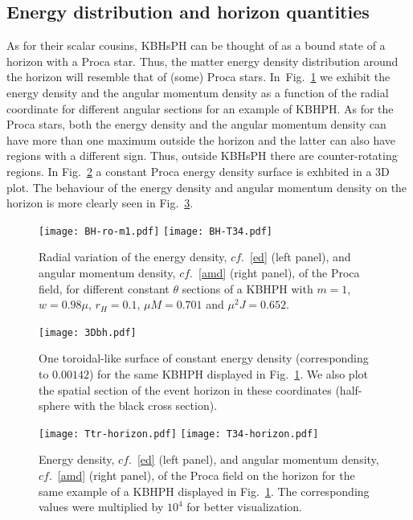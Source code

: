 \subsection{Energy distribution and horizon quantities}
\label{subsec_IV}
As for their scalar cousins, KBHsPH can be thought of as a bound state of a horizon with a Proca star. Thus, the matter energy density distribution around the horizon will resemble that of (some) Proca stars. In~Fig.~\ref{figenergybhs}  we exhibit the energy density and the angular momentum density as a function of the radial coordinate for different angular sections for an example of KBHPH. As for the Proca stars, both the energy density and the angular momentum density can have more than one maximum outside the horizon and the latter can also have regions with a different sign. Thus, outside KBHsPH there are counter-rotating regions. In Fig.~\ref{fig3Dbh} a constant Proca energy density surface is exhbited in a 3D plot. The behaviour of the energy density and angular momentum density on the horizon is more clearly seen in Fig.~\ref{horizoned}.


\begin{figure}[h!]
  \begin{center}
    \texttt{[image: BH-ro-m1.pdf]}
      \texttt{[image: BH-T34.pdf]}
  \end{center}
  \caption{Radial variation of the energy density, $cf.$~\eqref{ed} (left panel), and angular momentum density, $cf.$~\eqref{amd}  (right panel),  of the Proca field, for different constant $\theta$ sections of a KBHPH with $m=1$, $w=0.98\mu$, $r_H=0.1$,  $\mu M=0.701$ and $\mu^2J=0.652$.}
  \label{figenergybhs}
\end{figure}



\begin{figure}[h!]
  \begin{center}
    \texttt{[image: 3Dbh.pdf]}
  \end{center}
  \caption{One toroidal-like surface of constant energy density (corresponding to $0.00142$) for the same KBHPH displayed in Fig.~\ref{figenergybhs}. We also plot the spatial section of the event horizon in these coordinates (half-sphere with the black cross section).}
  \label{fig3Dbh}
\end{figure}


\begin{figure}[h!]
  \begin{center}
    \texttt{[image: Ttr-horizon.pdf]}\qquad \qquad 
      \texttt{[image: T34-horizon.pdf]}
  \end{center}
  \caption{Energy density, $cf.$~\eqref{ed} (left panel), and angular momentum density, $cf.$~\eqref{amd}  (right panel),  of the Proca field on the horizon for the same example of a KBHPH displayed in Fig.~\ref{figenergybhs}. The corresponding values were multiplied by $10^4$ for better visualization.}
  \label{horizoned}
\end{figure}


